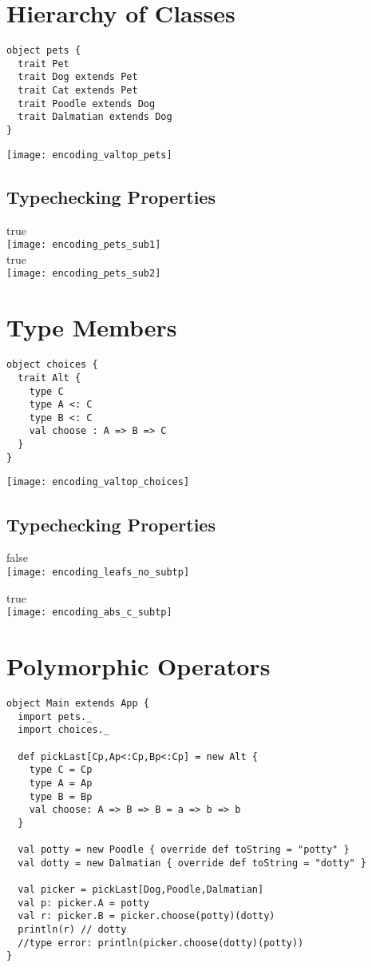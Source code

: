 \documentclass{article}
\begin{document}
\footnotesize
\section{Hierarchy of Classes}
\begin{verbatim}
object pets {
  trait Pet
  trait Dog extends Pet
  trait Cat extends Pet
  trait Poodle extends Dog
  trait Dalmatian extends Dog
}
\end{verbatim}
\texttt{[image: encoding\_valtop\_pets]}

\subsection{Typechecking Properties}
true\\ \texttt{[image: encoding\_pets\_sub1]}\\
true\\ \texttt{[image: encoding\_pets\_sub2]}

\section{Type Members}
\begin{verbatim}
object choices {
  trait Alt {
    type C
    type A <: C
    type B <: C
    val choose : A => B => C
  }
}
\end{verbatim}
\texttt{[image: encoding\_valtop\_choices]}

\subsection{Typechecking Properties}

false\\ \texttt{[image: encoding\_leafs\_no\_subtp]}

true\\ \texttt{[image: encoding\_abs\_c\_subtp]}

\section{Polymorphic Operators}
\begin{verbatim}
object Main extends App {
  import pets._
  import choices._

  def pickLast[Cp,Ap<:Cp,Bp<:Cp] = new Alt {
    type C = Cp
    type A = Ap
    type B = Bp
    val choose: A => B => B = a => b => b
  }

  val potty = new Poodle { override def toString = "potty" }
  val dotty = new Dalmatian { override def toString = "dotty" }

  val picker = pickLast[Dog,Poodle,Dalmatian]
  val p: picker.A = potty
  val r: picker.B = picker.choose(potty)(dotty)
  println(r) // dotty
  //type error: println(picker.choose(dotty)(potty))
}
\end{verbatim}
\end{document}
